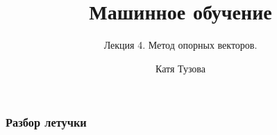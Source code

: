 \documentclass[12pt]{beamer}
\author{Катя Тузова}
\title{Машинное обучение}
\subtitle{Лекция 4. Метод опорных векторов.}
\date{}
\begin{document}
\frame{\titlepage}

\begin{frame}\frametitle{Разбор летучки}
\end{frame}
\end{document}
